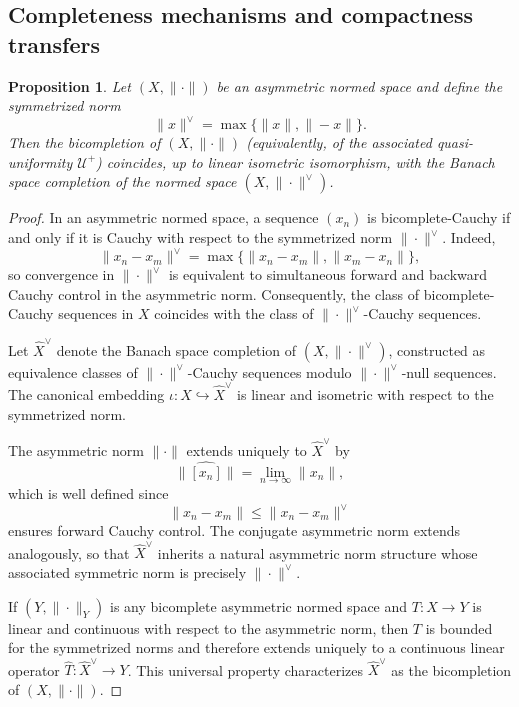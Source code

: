 \documentclass[preprint,12pt]{elsarticle}
\newtheorem{proposition}[theorem]{Proposition}
\begin{document}
\subsection{Completeness mechanisms and compactness transfers}
\label{ssec:fa-completion}

\begin{proposition}
\label{prop:fa-bicompletion}
Let $(X,\|\cdot\|)$ be an asymmetric normed space and define the
symmetrized norm
\[
\|x\|^{\vee}=\max\{\|x\|,\|{-}x\|\}.
\]
Then the bicompletion of $(X,\|\cdot\|)$ (equivalently, of the associated
quasi-uniformity $\mathcal U^{+}$) coincides, up to linear isometric
isomorphism, with the Banach space completion of the normed space
$(X,\|\cdot\|^{\vee})$.
\end{proposition}

\begin{proof}
In an asymmetric normed space, a sequence $(x_n)$ is bicomplete-Cauchy
if and only if it is Cauchy with respect to the symmetrized norm
$\|\cdot\|^{\vee}$. Indeed,
\[
\|x_n-x_m\|^{\vee}
=\max\{\|x_n-x_m\|,\|x_m-x_n\|\},
\]
so convergence in $\|\cdot\|^{\vee}$ is equivalent to simultaneous
forward and backward Cauchy control in the asymmetric norm. Consequently,
the class of bicomplete-Cauchy sequences in $X$ coincides with the class
of $\|\cdot\|^{\vee}$-Cauchy sequences.

Let $\widehat X^{\vee}$ denote the Banach space completion of
$(X,\|\cdot\|^{\vee})$, constructed as equivalence classes of
$\|\cdot\|^{\vee}$-Cauchy sequences modulo $\|\cdot\|^{\vee}$-null
sequences. The canonical embedding
$\iota:X\hookrightarrow \widehat X^{\vee}$ is linear and isometric with
respect to the symmetrized norm.

The asymmetric norm $\|\cdot\|$ extends uniquely to $\widehat X^{\vee}$
by
\[
\widehat{\|[x_n]\|}=\lim_{n\to\infty}\|x_n\|,
\]
which is well defined since
\[
\|x_n-x_m\|\le \|x_n-x_m\|^{\vee}
\]
ensures forward Cauchy control. The conjugate asymmetric norm extends
analogously, so that $\widehat X^{\vee}$ inherits a natural asymmetric
norm structure whose associated symmetric norm is precisely
$\|\cdot\|^{\vee}$.

If $(Y,\|\cdot\|_Y)$ is any bicomplete asymmetric normed space and
$T:X\to Y$ is linear and continuous with respect to the asymmetric norm,
then $T$ is bounded for the symmetrized norms and therefore extends
uniquely to a continuous linear operator
$\widehat T:\widehat X^{\vee}\to Y$. This universal property
characterizes $\widehat X^{\vee}$ as the bicompletion of $(X,\|\cdot\|)$.
\end{proof}
\end{document}
